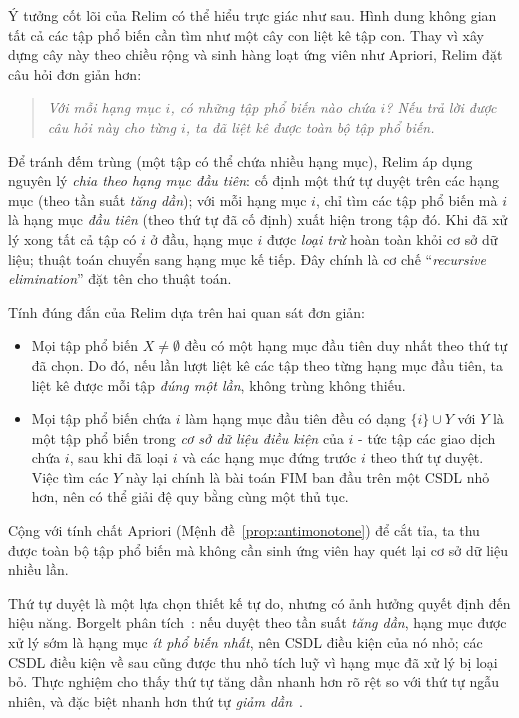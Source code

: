 \documentclass[12pt,a4paper]{report}
\begin{document}
Ý tưởng cốt lõi của Relim có thể hiểu trực giác như sau.
Hình dung không gian tất cả các tập phổ biến cần tìm như một cây con
liệt kê tập con. Thay vì xây dựng cây này theo chiều rộng và sinh hàng loạt
ứng viên như Apriori, Relim đặt câu hỏi đơn giản hơn:
\begin{quote}
\textit{Với mỗi hạng mục $i$, có những tập phổ biến nào chứa $i$? Nếu trả lời
được câu hỏi này cho từng $i$, ta đã liệt kê được toàn bộ tập phổ biến.}
\end{quote}
Để tránh đếm trùng (một tập có thể chứa nhiều hạng mục), Relim áp dụng nguyên
lý \textit{chia theo hạng mục đầu tiên}: cố định một thứ tự duyệt trên
các hạng mục (theo tần suất \textit{tăng dần}); với mỗi hạng mục $i$, chỉ tìm
các tập phổ biến mà $i$ là hạng mục \textit{đầu tiên} (theo thứ tự đã cố định)
xuất hiện trong tập đó. Khi đã xử lý xong tất cả tập có $i$ ở đầu, hạng mục $i$
được \textit{loại trừ} hoàn toàn khỏi cơ sở dữ liệu; thuật toán chuyển sang
hạng mục kế tiếp. Đây chính là cơ chế ``\textit{recursive elimination}'' đặt
tên cho thuật toán.

Tính đúng đắn của Relim dựa trên hai quan sát đơn giản:
\begin{itemize}
    \item[(i)] Mọi tập phổ biến $X \neq \emptyset$ đều có một hạng mục đầu tiên
    duy nhất theo thứ tự đã chọn. Do đó, nếu lần lượt liệt kê các tập theo từng
    hạng mục đầu tiên, ta liệt kê được mỗi tập \textit{đúng một lần}, không trùng
    không thiếu.
    \item[(ii)] Mọi tập phổ biến chứa $i$ làm hạng mục đầu tiên đều có dạng
    $\{i\} \cup Y$ với $Y$ là một tập phổ biến trong \textit{cơ sở dữ liệu điều
    kiện} của $i$ - tức tập các giao dịch chứa $i$, sau khi đã loại $i$ và các
    hạng mục đứng trước $i$ theo thứ tự duyệt. Việc tìm các $Y$ này lại chính là
    bài toán FIM ban đầu trên một CSDL nhỏ hơn, nên có thể giải đệ quy bằng cùng
    một thủ tục.
\end{itemize}
Cộng với tính chất Apriori (Mệnh đề~\ref{prop:antimonotone}) để cắt tỉa, ta thu
được toàn bộ tập phổ biến mà không cần sinh ứng viên hay quét lại cơ sở dữ liệu
nhiều lần.

Thứ tự duyệt là một lựa chọn thiết kế tự do, nhưng có ảnh hưởng quyết định đến
hiệu năng. Borgelt phân tích~\cite{borgelt2005}: nếu duyệt theo tần suất
\textit{tăng dần}, hạng mục được xử lý sớm là hạng mục \textit{ít phổ biến nhất},
nên CSDL điều kiện của nó nhỏ; các CSDL điều kiện về sau cũng được thu nhỏ tích
luỹ vì hạng mục đã xử lý bị loại bỏ. Thực nghiệm cho thấy thứ tự tăng dần nhanh
hơn rõ rệt so với thứ tự ngẫu nhiên, và đặc biệt nhanh hơn thứ tự
\textit{giảm dần}~\cite[Section~2.1]{borgelt2005}.
\end{document}
